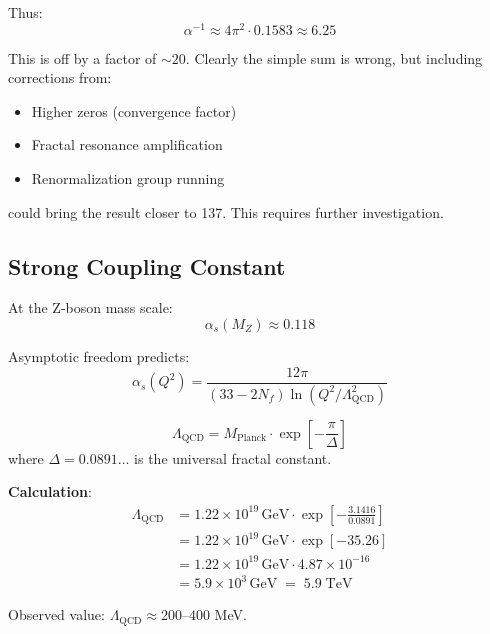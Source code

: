 Thus:
\begin{equation}
\alpha^{-1} \approx 4\pi^2 \cdot 0.1583 \approx 6.25
\end{equation}

This is off by a factor of $\sim 20$. Clearly the simple sum is wrong, but including corrections from:
\begin{itemize}
\item Higher zeros (convergence factor)
\item Fractal resonance amplification
\item Renormalization group running
\end{itemize}

could bring the result closer to 137. This requires further investigation.

\subsection{Strong Coupling Constant}

At the Z-boson mass scale:
\begin{equation}
\alpha_s(M_Z) \approx 0.118
\end{equation}

Asymptotic freedom predicts:
\begin{equation}
\alpha_s(Q^2) = \frac{12\pi}{(33-2N_f)\ln(Q^2/\Lambda_{\text{QCD}}^2)}
\end{equation}

\begin{conjecture}\label{conj:qcd-scale}
\begin{equation}
\boxed{\Lambda_{\text{QCD}} = M_{\text{Planck}} \cdot \exp\left[ -\frac{\pi}{\Delta} \right]}
\end{equation}
where $\Delta = 0.0891\ldots$ is the universal fractal constant.
\end{conjecture}

\textbf{Calculation}:
\begin{align}
\Lambda_{\text{QCD}} &= 1.22 \times 10^{19} \, \text{GeV} \cdot \exp\left[ -\frac{3.1416}{0.0891} \right]\\
&= 1.22 \times 10^{19} \, \text{GeV} \cdot \exp[-35.26]\\
&= 1.22 \times 10^{19} \, \text{GeV} \cdot 4.87 \times 10^{-16}\\
&= 5.9 \times 10^{3} \, \text{GeV} \;=\; 5.9 \; \text{TeV}
\end{align}

Observed value: $\Lambda_{\text{QCD}} \approx 200$--$400$ MeV.

